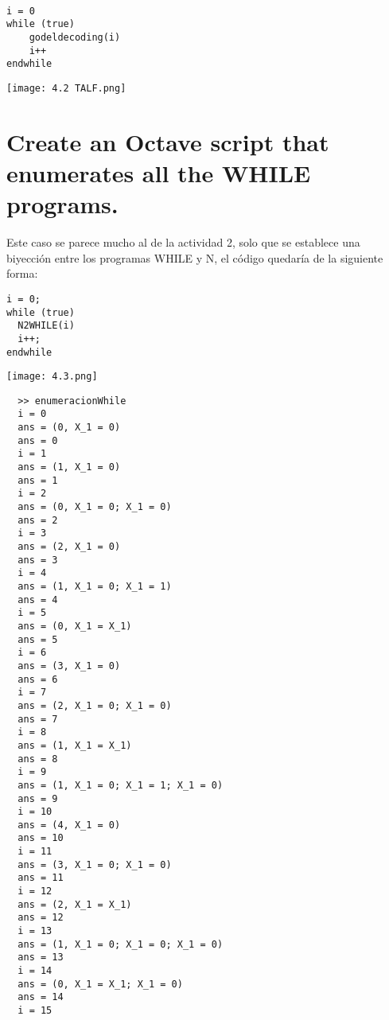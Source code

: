 \documentclass{article}
\begin{document}
\vspace{5mm}

\begin{verbatim}

i = 0
while (true)
    godeldecoding(i)
    i++
endwhile

\end{verbatim}

\vspace{5mm}

\texttt{[image: 4.2 TALF.png]}

\newpage

\section{\large{Create an Octave script that enumerates all the WHILE programs.}}

\vspace{3mm}

Este caso se parece mucho al de la actividad 2, solo que se establece una biyección entre los programas WHILE y N, el código quedaría de la siguiente forma:

\vspace{3mm}

\begin{verbatim}
i = 0;
while (true)
  N2WHILE(i)
  i++;
endwhile
\end{verbatim}

\vspace{3mm}

\texttt{[image: 4.3.png]}

\newpage

\begin{verbatim}
  >> enumeracionWhile
  i = 0
  ans = (0, X_1 = 0)
  ans = 0
  i = 1
  ans = (1, X_1 = 0)
  ans = 1
  i = 2
  ans = (0, X_1 = 0; X_1 = 0)
  ans = 2
  i = 3
  ans = (2, X_1 = 0)
  ans = 3
  i = 4
  ans = (1, X_1 = 0; X_1 = 1)
  ans = 4
  i = 5
  ans = (0, X_1 = X_1)
  ans = 5
  i = 6
  ans = (3, X_1 = 0)
  ans = 6
  i = 7
  ans = (2, X_1 = 0; X_1 = 0)
  ans = 7
  i = 8
  ans = (1, X_1 = X_1)
  ans = 8
  i = 9
  ans = (1, X_1 = 0; X_1 = 1; X_1 = 0)
  ans = 9
  i = 10
  ans = (4, X_1 = 0)
  ans = 10
  i = 11
  ans = (3, X_1 = 0; X_1 = 0)
  ans = 11
  i = 12
  ans = (2, X_1 = X_1)
  ans = 12
  i = 13
  ans = (1, X_1 = 0; X_1 = 0; X_1 = 0)
  ans = 13
  i = 14
  ans = (0, X_1 = X_1; X_1 = 0)
  ans = 14
  i = 15
\end{verbatim}
\end{document}

